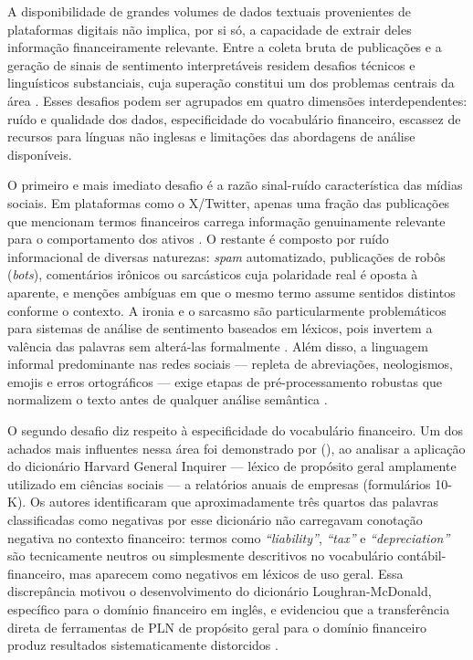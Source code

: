 A disponibilidade de grandes volumes de dados textuais provenientes de plataformas digitais não implica, por si só, a capacidade de extrair deles informação financeiramente relevante. Entre a coleta bruta de publicações e a geração de sinais de sentimento interpretáveis residem desafios técnicos e linguísticos substanciais, cuja superação constitui um dos problemas centrais da área \cite{kearney2014}. Esses desafios podem ser agrupados em quatro dimensões interdependentes: ruído e qualidade dos dados, especificidade do vocabulário financeiro, escassez de recursos para línguas não inglesas e limitações das abordagens de análise disponíveis.

O primeiro e mais imediato desafio é a razão sinal-ruído característica das mídias sociais. Em plataformas como o X/Twitter, apenas uma fração das publicações que mencionam termos financeiros carrega informação genuinamente relevante para o comportamento dos ativos \cite{bollen2011}. O restante é composto por ruído informacional de diversas naturezas: \textit{spam} automatizado, publicações de robôs (\textit{bots}), comentários irônicos ou sarcásticos cuja polaridade real é oposta à aparente, e menções ambíguas em que o mesmo termo assume sentidos distintos conforme o contexto. A ironia e o sarcasmo são particularmente problemáticos para sistemas de análise de sentimento baseados em léxicos, pois invertem a valência das palavras sem alterá-las formalmente \cite{liu2020survey}. Além disso, a linguagem informal predominante nas redes sociais --- repleta de abreviações, neologismos, emojis e erros ortográficos --- exige etapas de pré-processamento robustas que normalizem o texto antes de qualquer análise semântica \cite{sousa2025}.

O segundo desafio diz respeito à especificidade do vocabulário financeiro. Um dos achados mais influentes nessa área foi demonstrado por \citeauthor{loughran2011} (\citeyear{loughran2011}), ao analisar a aplicação do dicionário Harvard General Inquirer --- léxico de propósito geral amplamente utilizado em ciências sociais --- a relatórios anuais de empresas (formulários 10-K). Os autores identificaram que aproximadamente três quartos das palavras classificadas como negativas por esse dicionário não carregavam conotação negativa no contexto financeiro: termos como \textit{``liability''}, \textit{``tax''} e \textit{``depreciation''} são tecnicamente neutros ou simplesmente descritivos no vocabulário contábil-financeiro, mas aparecem como negativos em léxicos de uso geral. Essa discrepância motivou o desenvolvimento do dicionário Loughran-McDonald, específico para o domínio financeiro em inglês, e evidenciou que a transferência direta de ferramentas de PLN de propósito geral para o domínio financeiro produz resultados sistematicamente distorcidos \cite{loughran2011,kearney2014}.

